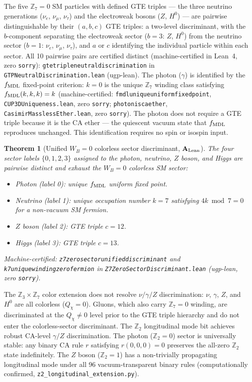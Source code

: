 \documentclass[11pt]{article}
\newtheorem{theorem}{Theorem}[section]
\theoremstyle{remark}
\newcommand{\lean}[1]{%
  \penalty-100
  \begingroup\def\_{\textunderscore\allowbreak}\texttt{#1}\endgroup}
\newcommand{\CatAL}{\ensuremath{\textbf{A}_{\rm Lean}}}
\begin{document}
The five $\mathbb{Z}_7 = 0$ SM particles with defined GTE triples --- the three neutrino
generations ($\nu_e$, $\nu_\mu$, $\nu_\tau$) and the electroweak bosons ($Z$, $H^0$) ---
are pairwise distinguishable by their $(a,b,c)$ GTE triples: a two-level discriminant,
with the $b$-component separating the electroweak sector ($b=3$: $Z$, $H^0$) from the
neutrino sector ($b=1$: $\nu_e$, $\nu_\mu$, $\nu_\tau$), and $a$ or $c$ identifying the
individual particle within each sector.
All 10 pairwise pairs are certified distinct (machine-certified in Lean~4, zero \texttt{sorry}):
\lean{gte\_triple\_neutral\_discrimination} in
\lean{GTPNeutralDiscrimination.lean} (ugp-lean).
The photon ($\gamma$) is identified by the $f_{\rm MDL}$ fixed-point criterion:
$k=0$ is the unique $\mathbb{Z}_7$ winding class satisfying $f_{\rm MDL}(k,k,k) = k$
(machine-certified: \lean{fmdl\_unique\_uniform\_fixed\_point},
\lean{CUP3DUniqueness.lean}, zero \texttt{sorry};
\lean{photon\_is\_ca\_ether}, \lean{CasimirMasslessEther.lean}, zero \texttt{sorry}).
The photon does not require a GTE triple because it is the CA ether --- the quiescent
vacuum state that $f_{\rm MDL}$ reproduces unchanged.
This identification requires no spin or isospin input.

\begin{theorem}[Unified $W_B{=}0$ colorless sector discriminant, $\CatAL$]
\label{thm:colorless-discriminant}
The four sector labels $\{0,1,2,3\}$ assigned to the photon, neutrino, $Z$ boson,
and Higgs are pairwise distinct and exhaust the $W_B{=}0$ colorless SM sector:
\begin{itemize}[nosep]
\item Photon (label 0): unique $f_{\rm MDL}$ uniform fixed point.
\item Neutrino (label 1): unique occupation number $k{=}7$ satisfying
  $4k \bmod 7 = 0$ for a non-vacuum SM fermion.
\item $Z$ boson (label 2): GTE triple $c = 12$.
\item Higgs (label 3): GTE triple $c = 13$.
\end{itemize}
Machine-certified: \lean{z7\_zero\_sector\_unified\_discriminant} and
\lean{k7\_unique\_winding\_zero\_fermion} in \lean{Z7ZeroSectorDiscriminant.lean}
(ugp-lean, zero \texttt{sorry}).
\end{theorem}

The $\mathbb{Z}_3{\times}\mathbb{Z}_7$ color extension does not resolve $\nu/\gamma/Z$
discrimination: $\nu$, $\gamma$, $Z$, and $H^0$ are all colorless ($Q_\chi = 0$).
Gluons, which also carry $\mathbb{Z}_7 = 0$ winding, are discriminated at the $Q_\chi \neq 0$ level
prior to the GTE triple hierarchy and do not enter the colorless-sector discriminant.
The $\mathbb{Z}_2$ longitudinal mode bit achieves robust CA-level $\gamma/Z$ discrimination.
The photon ($\mathbb{Z}_2 = 0$) sector is universally stable: any binary CA rule $r$
satisfying $r(0,0,0) = 0$ preserves the all-zero $\mathbb{Z}_2$ state indefinitely.
The $Z$ boson ($\mathbb{Z}_2 = 1$) has a non-trivially propagating longitudinal mode
under all 96 vacuum-transparent binary rules (computationally confirmed,
\texttt{z2\_longitudinal\_extension.py}).
\end{document}
